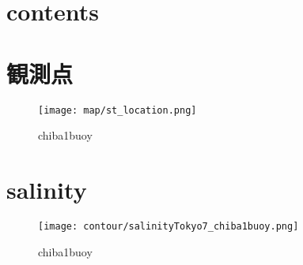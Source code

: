 \documentclass[12pt,a4paper]{jarticle}
\begin{document}
\section{contents}



\section{観測点}
\begin{figure}[hbtp]
  \texttt{[image: map/st\_location.png]}
  \caption{chiba1buoy}
  \label{地図}
\end{figure}

\section{salinity}
\begin{figure}[hbtp]
    \texttt{[image: contour/salinityTokyo7\_chiba1buoy.png]}
    \caption{chiba1buoy}
\end{figure}
\end{document}
